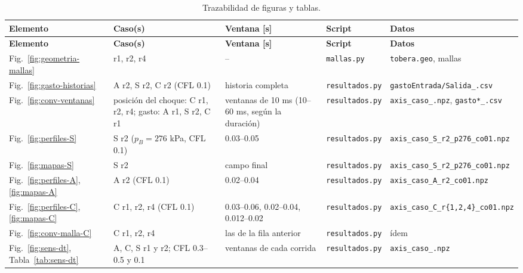 \documentclass[12pt,letterpaper]{article}
\numberwithin{equation}{section}
\begin{document}
{\scriptsize
\setlength{\tabcolsep}{3pt}
\renewcommand{\arraystretch}{1.15}
\begin{longtable}{p{2.3cm}p{3.3cm}p{2.3cm}p{2.7cm}p{3.7cm}}
\caption{Trazabilidad de figuras y tablas.}\label{tab:trazabilidad}\\
\toprule
\textbf{Elemento} & \textbf{Caso(s)} & \textbf{Ventana [s]} & \textbf{Script} & \textbf{Datos} \\
\midrule
\endfirsthead
\toprule
\textbf{Elemento} & \textbf{Caso(s)} & \textbf{Ventana [s]} & \textbf{Script} & \textbf{Datos} \\
\midrule
\endhead
Fig.~\ref{fig:geometria-mallas} & r1, r2, r4 & -- & \texttt{mallas.py} & \texttt{tobera.geo}, mallas \\
Fig.~\ref{fig:gasto-historias} & A r2, S r2, C r2 (CFL 0.1) & historia completa & \texttt{resultados.py} & \texttt{gastoEntrada/\allowbreak Salida\_\allowbreak *.\allowbreak csv} \\
Fig.~\ref{fig:conv-ventanas} & posición del choque: C r1, r2, r4; gasto: A r1, S r2, C r1 & ventanas de 10 ms (10--60 ms, según la duración) & \texttt{resultados.py} & \texttt{axis\_\allowbreak caso\_\allowbreak *.\allowbreak npz}, \texttt{gasto*\_\allowbreak *.\allowbreak csv} \\
Fig.~\ref{fig:perfiles-S} & S r2 ($p_B=276$ kPa, CFL 0.1) & 0.03--0.05 & \texttt{resultados.py} & \texttt{axis\_\allowbreak caso\_\allowbreak S\_\allowbreak r2\_\allowbreak p276\_\allowbreak co01.npz} \\
Fig.~\ref{fig:mapas-S} & S r2 & campo final & \texttt{resultados.py} & \texttt{axis\_\allowbreak caso\_\allowbreak S\_\allowbreak r2\_\allowbreak p276\_\allowbreak co01.npz} \\
Fig.~\ref{fig:perfiles-A}, \ref{fig:mapas-A} & A r2 (CFL 0.1) & 0.02--0.04 & \texttt{resultados.py} & \texttt{axis\_\allowbreak caso\_\allowbreak A\_\allowbreak r2\_\allowbreak co01.npz} \\
Fig.~\ref{fig:perfiles-C}, \ref{fig:mapas-C} & C r1, r2, r4 (CFL 0.1) & 0.03--0.06, 0.02--0.04, 0.012--0.02 & \texttt{resultados.py} & \texttt{axis\_\allowbreak caso\_\allowbreak C\_\allowbreak r\{1,2,4\}\_\allowbreak co01.npz} \\
Fig.~\ref{fig:conv-malla-C} & C r1, r2, r4 & las de la fila anterior & \texttt{resultados.py} & ídem \\
Fig.~\ref{fig:sens-dt}, Tabla~\ref{tab:sens-dt} & A, C, S r1 y r2; CFL 0.3--0.5 y 0.1 & ventanas de cada corrida & \texttt{resultados.py} & \texttt{axis\_\allowbreak caso\_\allowbreak *.\allowbreak npz} \\

\end{longtable}}
\end{document}
